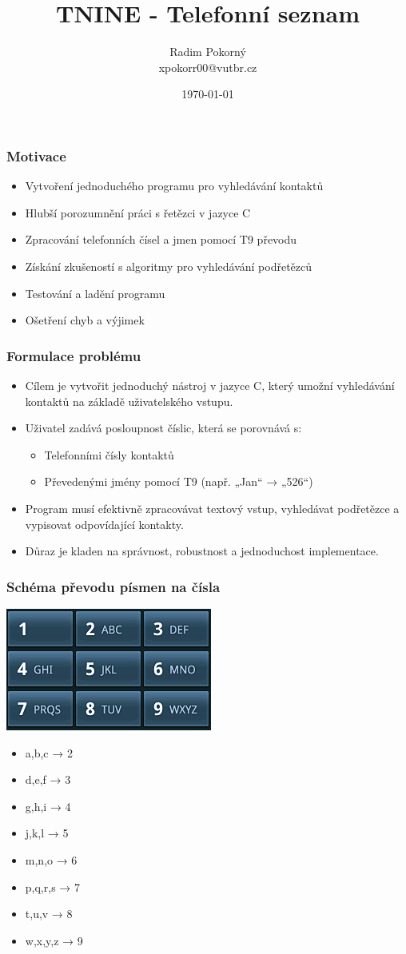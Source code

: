 \documentclass{beamer}
\title{TNINE - Telefonní seznam}
\author{Radim Pokorný \\ \small{xpokorr00@vutbr.cz}}
\institute{Vysoké učení technické v Brně \\ Fakulta informačních technologií}
\date{\today}
\begin{document}
\frame{\titlepage}

\begin{frame}
    \frametitle{Motivace}
    \begin{itemize}
        \item<1-> Vytvoření jednoduchého programu pro vyhledávání kontaktů
        \item<2-> Hlubší porozumnění práci s řetězci v jazyce C
        \item<3-> Zpracování telefonních čísel a jmen pomocí T9 převodu
        \item<4-> Získání zkušeností s algoritmy pro vyhledávání podřetězců
        \item<5-> Testování a ladění programu
        \item<6-> Ošetření chyb a výjimek
    \end{itemize}
\end{frame}
\begin{frame}
    \frametitle{Formulace problému}
    \begin{itemize}
        \item Cílem je vytvořit jednoduchý nástroj v jazyce C, který umožní vyhledávání kontaktů na základě uživatelského vstupu.
        \item Uživatel zadává posloupnost číslic, která se porovnává s:
        \begin{itemize}
            \item Telefonními čísly kontaktů
            \item Převedenými jmény pomocí T9 (např. „Jan“ → „526“)
        \end{itemize}
        \item Program musí efektivně zpracovávat textový vstup, vyhledávat podřetězce a vypisovat odpovídající kontakty.
        \item Důraz je kladen na správnost, robustnost a jednoduchost implementace.
    \end{itemize}
\end{frame}
\begin{frame}
    \frametitle{Schéma převodu písmen na čísla}
    \centering
    \includegraphics[height=0.2\textheight]{tnine.png} %
    \begin{itemize}
    \item a,b,c → 2
    \item d,e,f → 3
    \item g,h,i → 4
    \item j,k,l → 5
    \item m,n,o → 6
    \item p,q,r,s → 7
    \item t,u,v → 8
    \item w,x,y,z → 9
    \end{itemize}
\end{frame}
\end{document}
